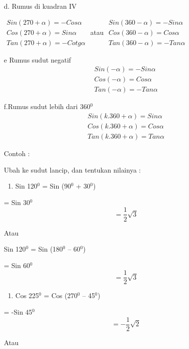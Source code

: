 \documentclass[11pt,fleqn]{book} %
\begin{document}
\begin{myEnumerate}
\begin{itemize}
d. Rumus di kuadran IV

\noindent \textbf{                  $\begin{array}{l} {Sin(270+\alpha )=-Cos\alpha } \\ {Cos(270+\alpha )=Sin\alpha } \\ {Tan(270+\alpha )=-Cotg\alpha } \end{array}$  }atau\textbf{      $\begin{array}{l} {Sin(360-\alpha )=-Sin\alpha } \\ {Cos(360-\alpha )=Cos\alpha } \\ {Tan(360-\alpha )=-Tan\alpha } \end{array}$}

e Rumus sudut negatif
\[\begin{array}{l} {Sin(-\alpha )=-Sin\alpha } \\ {Cos(-\alpha )=Cos\alpha } \\ {Tan(-\alpha )=-Tan\alpha } \end{array}\] 

\textbf{   }f.Rumus sudut lebih dari 360${}^{0}$
\[\begin{array}{l} {Sin(k.360+\alpha )=Sin\alpha } \\ {Cos(k.360+\alpha )=Cos\alpha } \\ {Tan(k.360+\alpha )=Tan\alpha } \end{array}\] 
\textbf{}

Contoh :

Ubah ke sudut lancip, dan tentukan nilainya :

\begin{enumerate}
\item  Sin 120${}^{0}$ = Sin (90${}^{0}$ + 30${}^{0}$)
\end{enumerate}

= Sin 30${}^{0}$
\[          = \frac{1}{2} \sqrt{3} \] 

Atau 

Sin 120${}^{0}$ = Sin (180${}^{0}$ -- 60${}^{0}$)

= Sin 60${}^{0}$
\[           = \frac{1}{2} \sqrt{3} \] 

\begin{enumerate}
\item  Cos 225${}^{0}$ = Cos (270${}^{0}$ -- 45${}^{0}$)
\end{enumerate}

= -Sin 45${}^{0}$
\[           = -\frac{1}{2} \sqrt{2} \] 

Atau 


\end{itemize}
\end{myEnumerate}
\end{document}
